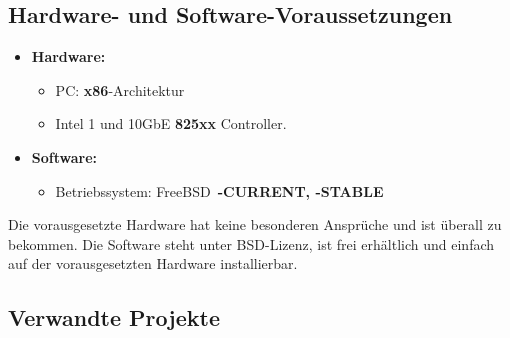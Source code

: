 \subsection{Hardware- und Software-Voraussetzungen} \label{sec:hwsw_voraus}
\begin{itemize}
 	\item \textbf{Hardware:}
		\begin{itemize}
			\item PC: \textbf{x86}-Architektur
 			\item Intel 1 und 10GbE \textbf{825xx} Controller.
		\end{itemize}
	\item \textbf{Software:}
		\begin{itemize}
			\item Betriebssystem: FreeBSD~\textbf{-CURRENT, -STABLE}
		\end{itemize}
\end{itemize}
Die vorausgesetzte Hardware hat keine besonderen Ansprüche und ist überall zu
bekommen.  Die Software steht unter BSD-Lizenz, ist frei erhältlich und einfach
auf der vorausgesetzten Hardware installierbar. 
\subsection{Verwandte Projekte}
